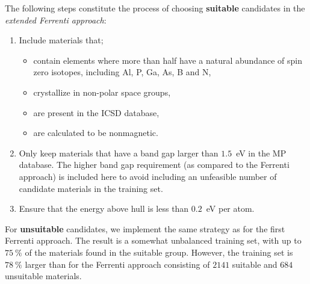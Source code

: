 \documentclass[superscriptaddress,unsortedaddress,
 amsmath,amssymb,
 aps,
]{revtex4-2}
\begin{document}
The following steps constitute the process of choosing \textbf{suitable} candidates in the \emph{extended Ferrenti approach}:
\begin{enumerate}
    \item Include materials that; 
    \begin{itemize}
        \item contain elements where more than half have a natural abundance of spin zero isotopes, including Al, P, Ga, As, B and N, 
        \item crystallize in non-polar space groups,
        \item are present in the ICSD database,
        \item are calculated to be nonmagnetic. 
    \end{itemize}
    \item Only keep materials that have a band gap larger than $1.5$~eV in the MP database. The higher band gap requirement (as compared to the Ferrenti approach) is included here to avoid including an unfeasible number of candidate materials in the training set. 
    \item Ensure that the energy above hull is less than $0.2$~eV per atom. 
\end{enumerate}

For \textbf{unsuitable} candidates, we implement the same strategy as for the first Ferrenti approach. The result is a somewhat unbalanced training set, with up to $75 \ \%$ of the materials found in the suitable group. However, the training set is $78 \ \%$ larger than for the Ferrenti approach consisting of  $2141$ suitable and $684$ unsuitable materials.

% 
\end{document}
